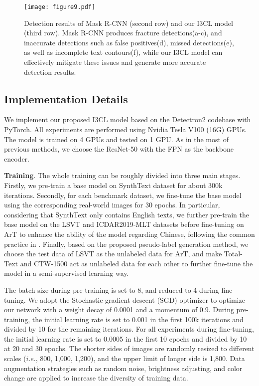  \begin{figure*}[ht]
  \centering
  \texttt{[image: figure9.pdf]}
  \caption{Detection results of Mask R-CNN (second row) and our I3CL model (third row). Mask R-CNN produces fracture detections(a-c), and inaccurate detections such as false positives(d), missed detections(e), as well as incomplete text contours(f), while our I3CL model can effectively mitigate these issues and generate more accurate detection results.}
  \label{fig9}
\end{figure*}


\subsection{Implementation Details}
We implement our proposed I3CL model based on the Detectron2 codebase with PyTorch. All experiments are performed using Nvidia Tesla V100 (16G) GPUs. The model is trained on 4 GPUs and tested on 1 GPU. As in the most of previous methods, we choose the ResNet-50 with the FPN as the backbone encoder.

\textbf{Training}. The whole training can be roughly divided into three main stages. Firstly, we pre-train a base model on SynthText dataset for about 300k iterations. Secondly, for each benchmark dataset, we fine-tune the base model using the corresponding real-world images for 30 epochs. In particular, considering that SynthText only contains English texts, we further pre-train the base model on the LSVT \citep{lsvt} and ICDAR2019-MLT \citep{icdar2019mlt} datasets before fine-tuning on ArT  to enhance the ability of the model regarding Chinese, following the common practice in \citep{crafts}. Finally, based on the proposed pseudo-label generation method, we choose the test data of LSVT as the unlabeled data for ArT, and make Total-Text and CTW-1500 act as unlabeled data for each other to further fine-tune the model in a semi-supervised learning way.

The batch size during pre-training is set to 8, and reduced to 4 during fine-tuning. We adopt the Stochastic gradient descent (SGD) optimizer to optimize our network with a weight decay of 0.0001 and a momentum of 0.9. During pre-training, the initial learning rate is set to 0.001 in the first 100k iterations and divided by 10 for the remaining iterations. For all experiments during fine-tuning, the initial learning rate is set to 0.0005 in the first 10 epochs and divided by 10 at 20 and 30 epochs. The shorter sides of images are randomly resized to different scales ($i.e.$, 800, 1,000, 1,200), and the upper limit of longer side is 1,800. Data augmentation strategies such as random noise, brightness adjusting, and color change are applied to increase the diversity of training data.

